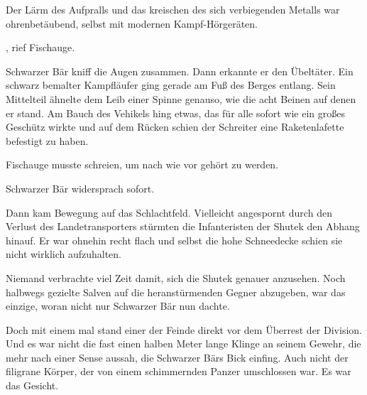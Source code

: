 \par

Der Lärm des Aufpralls und das kreischen des sich verbiegenden Metalls war ohrenbetäubend, selbst mit modernen Kampf-Hörgeräten.

\par

, rief Fischauge. 

\par

Schwarzer Bär kniff die Augen zusammen. Dann erkannte er den Übeltäter. Ein schwarz bemalter Kampfläufer ging gerade am Fuß des Berges entlang. Sein Mittelteil ähnelte dem Leib einer Spinne genauso, wie die acht Beinen auf denen er stand. Am Bauch des Vehikels hing etwas, das für alle sofort wie ein großes Geschütz wirkte und auf dem Rücken schien der Schreiter eine Raketenlafette befestigt zu haben.

\par

 Fischauge musste schreien, um nach wie vor gehört zu werden. 

\par

Schwarzer Bär widersprach sofort. 

\par

Dann kam Bewegung auf das Schlachtfeld. Vielleicht angespornt durch den Verlust des Landetransporters stürmten die Infanteristen der Shutek den Abhang hinauf. Er war ohnehin recht flach und selbst die hohe Schneedecke schien sie nicht wirklich aufzuhalten.

\par

Niemand verbrachte viel Zeit damit, sich die Shutek genauer anzusehen. Noch halbwegs gezielte Salven auf die heranstürmenden Gegner abzugeben, war das einzige, woran nicht nur Schwarzer Bär nun dachte.

\par

Doch mit einem mal stand einer der Feinde direkt vor dem Überrest der Division. Und es war nicht die fast einen halben Meter lange Klinge an seinem Gewehr, die mehr nach einer Sense aussah, die Schwarzer Bärs Bick einfing. Auch nicht der filigrane Körper, der von einem schimmernden Panzer umschlossen war. Es war das Gesicht.

